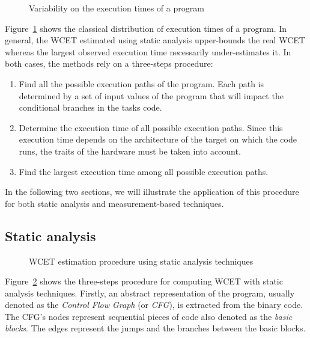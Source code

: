 \documentclass[main.tex]{subfiles}
\begin{document}
\begin{figure}
    \centering
    \scalebox{1.3}{}
    \caption{Variability on the execution times of a program }
    \label{fig_stateOfTheArt_WCET}
\end{figure}
Figure~\ref{fig_stateOfTheArt_WCET} shows the classical distribution of execution times of a program. In general, the WCET estimated using static analysis upper-bounds the real WCET whereas the largest observed execution time necessarily under-estimates it. In both cases, the methods rely on a three-steps procedure:
\begin{enumerate}
    \item Find all the possible execution paths of the program. Each path is determined by a set of input values of the program that will impact the conditional branches in the tasks code.
    \item Determine the execution time of all possible execution paths. Since this execution time depends on the architecture of the target on which the code runs, the traits of the hardware must be taken into account.
    \item Find the largest execution time among all possible execution paths.
\end{enumerate}

In the following two sections, we will illustrate the application of this procedure for both static analysis and measurement-based techniques.





\subsection{Static analysis}

\begin{figure}
    \centering
    \scalebox{0.72}{}
    \caption{WCET estimation procedure using static analysis techniques}
    \label{fig_stateOfTheArt_StaticAnalysis}
\end{figure}

Figure~\ref{fig_stateOfTheArt_StaticAnalysis} shows the three-steps procedure for computing WCET with static analysis techniques. Firstly, an abstract representation of the program, usually denoted as the \emph{Control Flow Graph} (or \emph{CFG}), is extracted from the binary code. The CFG's nodes represent sequential pieces of code also denoted as the \emph{basic blocks}. The edges represent the jumps and the branches between the basic blocks.
\end{document}
